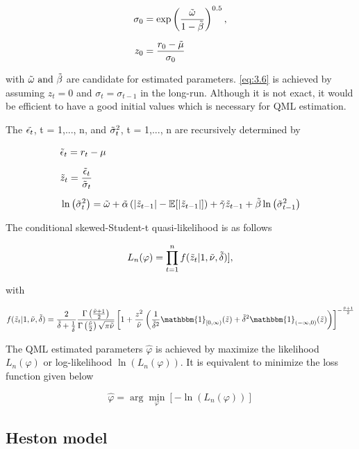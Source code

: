\documentclass[12pt,a4paper]{article}
\numberwithin{equation}{section}
\begin{document}
\begin{align}
\sigma_{0} &= \exp \left( \frac{\Tilde{\omega}}{1-\Tilde{\beta}} \right)^{0.5}, \label{eq:3.6}\\[0.6em]
z_{0} &= \frac{r_{0} - \Tilde{\mu}}{\sigma_{0}}
\end{align}

with $\Tilde{\omega} \text{ and } \Tilde{\beta}$ are candidate for estimated parameters. \eqref{eq:3.6} is achieved by assuming $z_t = 0$ and $\sigma_t = \sigma_{t-1}$ in the long-run. Although it is not exact, it would be efficient to have a good initial values which is necessary for QML estimation.

The $\Tilde{\epsilon_t}$, t = 1,..., n, and $\Tilde{\sigma}^2_t$, t = 1,..., n are recursively determined by

\begin{align*}
& \Tilde{\epsilon}_t = r_t - \mu \\[0.6em]
& \Tilde{z}_t = \frac{\Tilde{\epsilon}_t}{\Tilde{\sigma}_t}\\[0.6em]
 &\ln\left(\Tilde{\sigma}_t^2\right) = \Tilde{\omega} + \Tilde{\alpha} \left( |\Tilde{z}_{t-1}| - \mathbb{E}[|\Tilde{z}_{t-1}|] \right) + \Tilde{\gamma} \Tilde{z}_{t-1} +  \Tilde{\beta} \ln\left(\Tilde{\sigma}_{t-1}^2\right)
\end{align*}

The conditional skewed-Student-t quasi-likelihood is as follows

\[L_n(\varphi) = \prod_{t=1}^{n} f(\Tilde{z}_t|1, \Tilde{\nu}, \Tilde{\delta})], \]

with

\[f(\Tilde{z}_t|1, \Tilde{\nu}, \Tilde{\delta}) = \frac{2}{\Tilde{\delta}+ \frac{1}{\Tilde{\delta}}} \frac{\Gamma\left(\frac{\Tilde{\nu} + 1}{2}\right)}{\Gamma\left(\frac{\Tilde{\nu}}{2}\right) \sqrt{\pi \Tilde{\nu}}}
\left[ 1 + \frac{z^2}{\Tilde{\nu}} \left( \frac{1}{\Tilde{\delta}^2} \mathbbm{1}_{[0, \infty)} (\Tilde{z}) + \Tilde{\delta}^2 \mathbbm{1}_{(-\infty, 0)} (\Tilde{z}) \right) \right]^{-\frac{\Tilde{\nu} + 1}{2}}
\]

The QML estimated parameters $\hat{\varphi}$ is achieved by maximize the likelihood $L_n(\varphi)$ or log-likelihood $\ln(L_n(\varphi))$. It is equivalent to minimize the loss function given below

\[\hat{\varphi} = \arg\min_\varphi \left [ - \ln(L_n(\varphi)) \right] \]


\subsection{Heston model}
\end{document}
